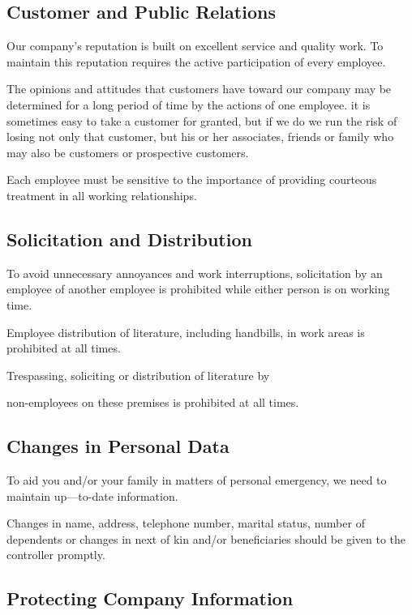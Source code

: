 \subsection{Customer and Public Relations}

Our company's reputation is built on excellent service and quality work. To maintain this reputation requires the active participation of every employee.

The opinions and attitudes that customers have toward our company may be determined for a long period of time by the actions of one employee. it is sometimes easy to take a customer for granted, but if we do we run the risk of losing not only that customer, but his or her associates, friends or family who may also be customers or prospective customers.

Each employee must be sensitive to the importance of providing courteous treatment in all working relationships.

\subsection{Solicitation and Distribution}

To avoid unnecessary annoyances and work interruptions, solicitation by an employee of another employee is prohibited while either person is on working time.

Employee distribution of literature, including handbills, in work areas is prohibited at all times.

Trespassing, soliciting or distribution of literature by

non-employees on these premises is prohibited at all times.

\subsection{Changes in Personal Data}

To aid you and/or your family in matters of personal emergency, we need to maintain up—to-date information.

Changes in name, address, telephone number, marital status, number of dependents or changes in next of kin and/or beneficiaries should be given to the controller promptly.

\subsection{Protecting Company Information}


